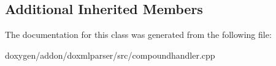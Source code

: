 \subsection*{Additional Inherited Members}


The documentation for this class was generated from the following file\+:\begin{DoxyCompactItemize}
\item 
doxygen/addon/doxmlparser/src/compoundhandler.\+cpp\end{DoxyCompactItemize}
